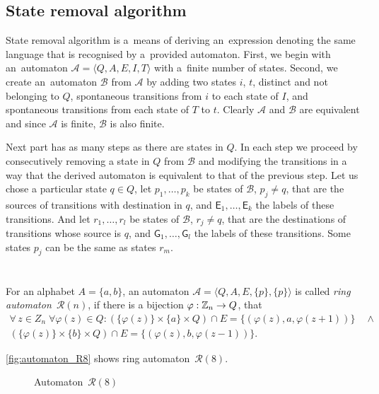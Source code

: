 \subsection{State removal algorithm}

State removal algorithm is a~means of deriving an~expression denoting the same language that is recognised by a~provided automaton. First, we begin with an~automaton $\mathcal{A} = \langle Q, A, E, I, T \rangle$ with a~finite number of states. Second, we create an~automaton $\mathcal{B}$ from $\mathcal{A}$ by adding two states $i$, $t$, distinct and not belonging to $Q$, spontaneous transitions from $i$ to each state of $I$, and spontaneous transitions from each state of $T$ to $t$. Clearly $\mathcal{A}$ and $\mathcal{B}$ are equivalent and since $\mathcal{A}$ is finite, $\mathcal{B}$ is also finite.

Next part has as many steps as there are states in $Q$. In each step we proceed by consecutively removing a state in $Q$ from $\mathcal{B}$ and modifying the transitions in a way that the derived automaton is equivalent to that of the previous step. Let us chose a particular state $q \in Q$, let $p_1, \dotsc , p_k$ be states of $\mathcal{B}$, $p_j \neq q$, that are the sources of transitions with destination in $q$, and $\mathsf{E}_1, \dotsc , \mathsf{E}_k$ the labels of these transitions. And let $r_1, \dotsc , r_l$ be states of $\mathcal{B}$, $r_j \neq q$, that are the destinations of transitions whose source is $q$, and $\mathsf{G}_1, \dotsc , \mathsf{G}_l$ the labels of these transitions. Some states $p_j$ can be the same as states $r_m$.

\section{}

\begin{defn}
    For an alphabet $A = {\{a,b\}}$, an automaton $\mathcal{A} = \langle Q, A, E, \{p\}, \{p\} \rangle$ is called \emph{ring automaton~${\mathcal{R}(n)}$}, if there is a bijection $\varphi: \mathbb{Z}_n \to Q$, that
    \begin{multline*}
        \forall \, z \in Z_n \; \forall \varphi(z) \in Q: (\{\varphi(z)\} \times \{a\} \times Q) \cap E = \{(\varphi(z),a,\varphi(z+1))\} \quad \land \\
            (\{\varphi(z)\} \times \{b\} \times Q) \cap E = \{(\varphi(z),b,\varphi(z-1))\}.
    \end{multline*}
\end{defn}

\begin{example}
    \autoref*{fig:automaton_R8} shows ring automaton~${\mathcal{R}(8)}$.
\end{example}

\begin{figure}[h]
    \centering
    
    \caption{Automaton~${\mathcal{R}(8)}$}\label{fig:automaton_R8}
\end{figure}